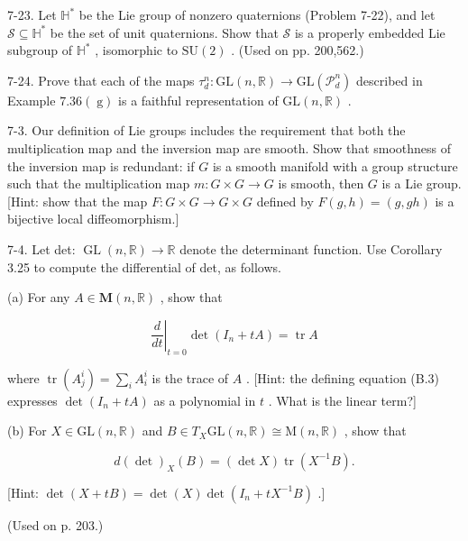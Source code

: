 \begin{exercise}
\label{prob:7-23}


7-23. Let ${\mathbb{H}}^{ * }$ be the Lie group of nonzero quaternions (Problem 7-22), and let $\mathcal{S} \subseteq  {\mathbb{H}}^{ * }$ be the set of unit quaternions. Show that $\mathcal{S}$ is a properly embedded Lie subgroup of ${\mathbb{H}}^{ * }$ , isomorphic to $\mathrm{{SU}}\left( 2\right)$ . (Used on pp. 200,562.)
\end{exercise}

\begin{exercise}
\label{prob:7-24}


7-24. Prove that each of the maps ${\tau }_{d}^{n} : \mathrm{{GL}}\left( {n,\mathbb{R}}\right)  \rightarrow  \mathrm{{GL}}\left( {\mathcal{P}}_{d}^{n}\right)$ described in Example ${7.36}\left( \mathrm{\;g}\right)$ is a faithful representation of $\mathrm{{GL}}\left( {n,\mathbb{R}}\right)$ .
\end{exercise}

\begin{exercise}
\label{prob:7-3}


7-3. Our definition of Lie groups includes the requirement that both the multiplication map and the inversion map are smooth. Show that smoothness of the inversion map is redundant: if $G$ is a smooth manifold with a group structure such that the multiplication map $m : G \times  G \rightarrow  G$ is smooth, then $G$ is a Lie group. [Hint: show that the map $F : G \times  G \rightarrow  G \times  G$ defined by $F\left( {g, h}\right)  = \left( {g,{gh}}\right)$ is a bijective local diffeomorphism.]
\end{exercise}

\begin{exercise}
\label{prob:7-4}


7-4. Let det: $\operatorname{GL}\left( {n,\mathbb{R}}\right)  \rightarrow  \mathbb{R}$ denote the determinant function. Use Corollary 3.25 to compute the differential of det, as follows.

(a) For any $A \in  \mathbf{M}\left( {n,\mathbb{R}}\right)$ , show that

\[
{\left. \frac{d}{dt}\right| }_{t = 0}\det \left( {{I}_{n} + {tA}}\right)  = \operatorname{tr}A
\]

where $\operatorname{tr}\left( {A}_{j}^{i}\right)  = \mathop{\sum }\limits_{i}{A}_{i}^{i}$ is the trace of $A$ . [Hint: the defining equation (B.3) expresses $\det \left( {{I}_{n} + {tA}}\right)$ as a polynomial in $t$ . What is the linear term?]

(b) For $X \in  \mathrm{{GL}}\left( {n,\mathbb{R}}\right)$ and $B \in  {T}_{X}\mathrm{{GL}}\left( {n,\mathbb{R}}\right)  \cong  \mathrm{M}\left( {n,\mathbb{R}}\right)$ , show that

\[
d{\left( \det \right) }_{X}\left( B\right)  = \left( {\det X}\right) \operatorname{tr}\left( {{X}^{-1}B}\right) . \tag{7.11}
\]

[Hint: $\det \left( {X + {tB}}\right)  = \det \left( X\right) \det \left( {{I}_{n} + t{X}^{-1}B}\right)$ .]

(Used on p. 203.)
\end{exercise}

